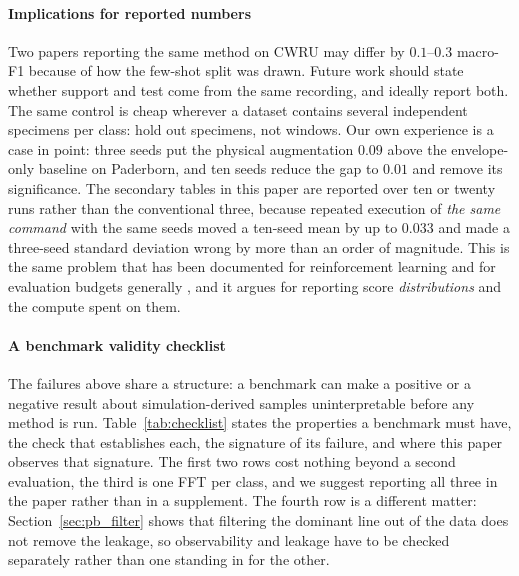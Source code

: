 \documentclass[journal]{IEEEtran}
\begin{document}
\paragraph{Implications for reported numbers} Two papers reporting the same
method on CWRU may differ by $0.1$--$0.3$ macro-F1 because of how the few-shot
split was drawn. Future work should state whether support and test
come from the same recording, and ideally report both. The same control is
cheap wherever a dataset contains several independent specimens per class: hold
out specimens, not windows. Our own experience is a case in point: three seeds
put the physical augmentation $0.09$ above the envelope-only baseline on
Paderborn, and ten seeds reduce the gap to $0.01$ and remove its significance.
The secondary tables in this paper are reported over ten or twenty runs
rather than the conventional three, because repeated execution of \emph{the same
command} with the same seeds moved a ten-seed mean by up to $0.033$ and made a
three-seed standard deviation wrong by more than an order of magnitude. This is
the same problem that has been documented for reinforcement learning
\cite{henderson2018matters} and for evaluation budgets generally
\cite{dodge2019showyourwork}, and it argues for reporting score
\emph{distributions} and the compute spent on them.

\paragraph{A benchmark validity checklist} The failures above share a
structure: a benchmark can make a positive or a negative result about
simulation-derived samples uninterpretable before any method is run.
Table~\ref{tab:checklist} states the properties a benchmark must have, the check
that establishes each, the signature of its failure, and where this paper
observes that signature. The first two rows cost nothing beyond a second
evaluation, the third is one FFT per class, and we suggest reporting all three
in the paper rather than in a supplement. The fourth row is a different matter:
Section~\ref{sec:pb_filter} shows that filtering the dominant line out of the
data does not remove the leakage, so observability and leakage have to be
checked separately rather than one standing in for the other.
\end{document}
